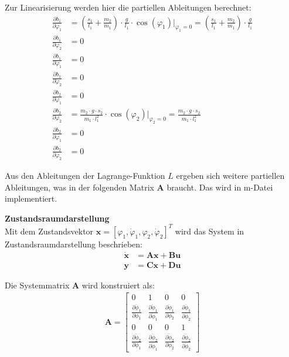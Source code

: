 Zur Linearisierung werden hier die partiellen Ableitungen berechnet:
\begin{align}
  \frac{\partial b_1}{\partial \varphi_1} &= \left(\frac{s_1}{l_1} + \frac{m_2}{m_1}\right) \cdot \frac{g}{l_1} \cdot \cos(\varphi_1)\Big|_{\varphi_1=0} = \left(\frac{s_1}{l_1} + \frac{m_2}{m_1}\right) \cdot\frac{g}{l_1} \\
  \frac{\partial b_1}{\partial \varphi_2} &= 0 \\
  \frac{\partial b_1}{\partial \dot{\varphi}_1} &= 0 \\
  \frac{\partial b_1}{\partial \dot{\varphi}_2} &= 0 \\
  \frac{\partial b_2}{\partial \varphi_1} &= 0 \\
  \frac{\partial b_2}{\partial \varphi_2} &= \frac{m_2 \cdot g \cdot s_2}{m_1 \cdot l_1^2} \cdot \cos(\varphi_2)\Big|_{\varphi_2=0} = \frac{m_2 \cdot g \cdot s_2}{m_1 \cdot l_1^2} \\
  \frac{\partial b_2}{\partial \dot{\varphi}_1} &= 0 \\
  \frac{\partial b_2}{\partial \dot{\varphi}_2} &= 0
\end{align}

Aus den Ableitungen der Lagrange-Funktion $L$ ergeben sich weitere
partiellen Ableitungen, was in der folgenden Matrix $\mathbf{A}$
braucht. Das wird in m-Datei 
implementiert.

\textbf{Zustandsraumdarstellung}\\
Mit dem Zustandsvektor $\mathbf{x} = [\varphi_1, \dot{\varphi}_1, \varphi_2, \dot{\varphi}_2]^T$ wird das System in Zustandsraumdarstellung beschrieben:
\begin{align}
  \dot{\mathbf{x}} &= \mathbf{A}\mathbf{x} + \mathbf{B}\mathbf{u} \\
  \mathbf{y} &= \mathbf{C}\mathbf{x} + \mathbf{D}\mathbf{u}
\end{align}

Die Systemmatrix $\mathbf{A}$ wird konstruiert als:
\begin{align}
  \mathbf{A} = 
  \begin{bmatrix}
    0 & 1 & 0 & 0 \\
    \frac{\partial \ddot{\phi}_1}{\partial \phi_1} & \frac{\partial \ddot{\phi}_1}{\partial \dot{\phi}_1} & \frac{\partial \ddot{\phi}_1}{\partial \phi_2} & \frac{\partial \ddot{\phi}_1}{\partial \dot{\phi}_2} \\
    0 & 0 & 0 & 1 \\
    \frac{\partial \ddot{\phi}_2}{\partial \phi_1} & \frac{\partial \ddot{\phi}_2}{\partial \dot{\phi}_1} & \frac{\partial \ddot{\phi}_2}{\partial \phi_2} & \frac{\partial \ddot{\phi}_2}{\partial \dot{\phi}_2}
  \end{bmatrix}
\end{align}

